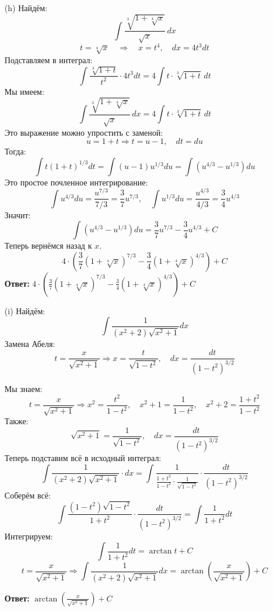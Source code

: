 \documentclass[a4paper]{article}
\renewcommand{\f}[2]{\frac{#1}{#2}}
\begin{document}
\begin{enumerate}
\begin{enumerate}
    \item[(h)]Найдём:
    $$\int \f{\sqrt[3]{1 + \sqrt[4]{x}}}{\sqrt{x}} \, dx$$
    \[
    t = \sqrt[4]{x} \quad \Rightarrow \quad x = t^4, \quad dx = 4t^3 dt
    \]
    Подставляем в интеграл:
    \[
    \int \frac{\sqrt[3]{1 + t}}{t^2} \cdot 4t^3 dt = 4 \int t \cdot \sqrt[3]{1 + t} \, dt
    \]
    Мы имеем:
    \[
    \int \frac{\sqrt[3]{1 + \sqrt[4]{x}}}{\sqrt{x}} \, dx = 4 \int t \cdot \sqrt[3]{1 + t} \, dt
    \]
    Это выражение можно упростить с заменой:
    \[
    u = 1 + t \Rightarrow t = u - 1,\quad dt = du
    \]
    Тогда:
    \[
    \int t (1 + t)^{1/3} dt = \int (u - 1) u^{1/3} du = \int (u^{4/3} - u^{1/3}) du
    \]
    Это простое почленное интегрирование:
    \[
    \int u^{4/3} du = \frac{u^{7/3}}{7/3} = \frac{3}{7} u^{7/3},\quad \int u^{1/3} du = \frac{u^{4/3}}{4/3} = \frac{3}{4} u^{4/3}
    \]
    Значит:
    \[
    \int (u^{4/3} - u^{1/3}) du = \frac{3}{7} u^{7/3} - \frac{3}{4} u^{4/3} + C
    \]
    Теперь вернёмся назад к \( x \).
    \[
    4 \cdot \left( \frac{3}{7} (1 + \sqrt[4]{x})^{7/3} - \frac{3}{4} (1 + \sqrt[4]{x})^{4/3} \right) + C
    \]
    \textbf{Ответ:} $4 \cdot \left( \frac{3}{7} (1 + \sqrt[4]{x})^{7/3} - \frac{3}{4} (1 + \sqrt[4]{x})^{4/3} \right) + C$\\

    \item[(i)]Найдём:
    $$\int \f{1}{(x^2+ 2)\sqrt{x^2  + 1}}dx$$
    Замена Абеля:
    \[
    t = \frac{x}{\sqrt{x^2 + 1}} \Rightarrow x = \frac{t}{\sqrt{1 - t^2}}, \quad dx = \frac{dt}{(1 - t^2)^{3/2}}
    \]
    
        
    Мы знаем:  
    \[
    t = \frac{x}{\sqrt{x^2 + 1}} \Rightarrow x^2 = \frac{t^2}{1 - t^2}, \quad x^2 + 1 = \frac{1}{1 - t^2}, \quad x^2 + 2 = \frac{1 + t^2}{1 - t^2}
    \]
    Также:
    \[
    \sqrt{x^2 + 1} = \frac{1}{\sqrt{1 - t^2}}, \quad dx = \frac{dt}{(1 - t^2)^{3/2}}
    \]
    Теперь подставим всё в исходный интеграл:
    \[
    \int \frac{1}{(x^2 + 2)\sqrt{x^2 + 1}} \cdot dx = \int \frac{1}{\frac{1 + t^2}{1 - t^2} \cdot \frac{1}{\sqrt{1 - t^2}}} \cdot \frac{dt}{(1 - t^2)^{3/2}}
    \]
    Соберём всё:
    \[
    \int \frac{(1 - t^2) \sqrt{1 - t^2}}{1 + t^2} \cdot \frac{dt}{(1 - t^2)^{3/2}} = \int \frac{1}{1 + t^2} dt
    \]
    Интегрируем:
    \[
    \int \frac{1}{1 + t^2} dt = \arctan t + C
    \]
    \[
    t = \frac{x}{\sqrt{x^2 + 1}} \Rightarrow \int \f{1}{(x^2+ 2)\sqrt{x^2  + 1}}dx = \arctan \left( \frac{x}{\sqrt{x^2 + 1}} \right) + C
    \]

    \textbf{Ответ:} $\arctan \left( \frac{x}{\sqrt{x^2 + 1}} \right) + C$


\end{enumerate}


\end{enumerate}
\end{document}
